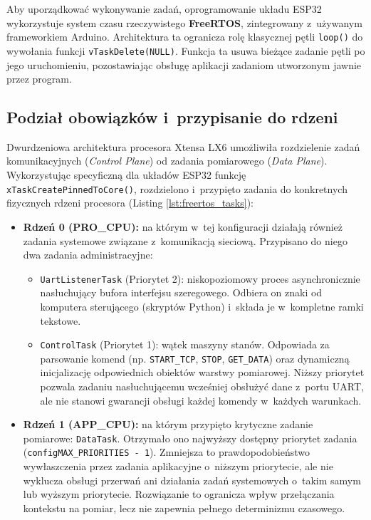 Aby uporządkować wykonywanie zadań, oprogramowanie układu ESP32 wykorzystuje system czasu rzeczywistego \textbf{FreeRTOS}, zintegrowany z~używanym frameworkiem Arduino.
Architektura ta ogranicza rolę klasycznej pętli \texttt{loop()} do wywołania funkcji \texttt{vTaskDelete(NULL)}. Funkcja ta usuwa bieżące zadanie pętli po jego uruchomieniu, pozostawiając obsługę aplikacji zadaniom utworzonym jawnie przez program.

\subsection{Podział obowiązków i~przypisanie do rdzeni}
Dwurdzeniowa architektura procesora Xtensa LX6 umożliwiła rozdzielenie zadań komunikacyjnych (\textit{Control Plane}) od zadania pomiarowego (\textit{Data Plane}).
Wykorzystując specyficzną dla układów ESP32 funkcję \texttt{xTaskCreatePinnedToCore()}, rozdzielono i~przypięto zadania do konkretnych fizycznych rdzeni procesora (Listing \ref{lst:freertos_tasks}):

\begin{itemize}
        \item \textbf{Rdzeń 0 (PRO\_CPU):}
            na którym w~tej konfiguracji działają również zadania systemowe związane z~komunikacją sieciową.
          Przypisano do niego dwa zadania administracyjne:
          \begin{itemize}
              \item \texttt{UartListenerTask} (Priorytet 2): niskopoziomowy proces asynchronicznie nasłuchujący bufora interfejsu szeregowego.
                    Odbiera on znaki od komputera sterującego (skryptów Python) i~składa je w~kompletne ramki tekstowe.
              \item \texttt{ControlTask} (Priorytet 1): wątek maszyny stanów.
                    Odpowiada za parsowanie komend (np. \texttt{START\_TCP}, \texttt{STOP}, \texttt{GET\_DATA}) oraz dynamiczną inicjalizację odpowiednich obiektów warstwy pomiarowej.
                    Niższy priorytet pozwala zadaniu nasłuchującemu wcześniej obsłużyć dane z~portu UART, ale nie stanowi gwarancji obsługi każdej komendy w~każdych warunkach.
          \end{itemize}
        \item \textbf{Rdzeń 1 (APP\_CPU):}
            na którym przypięto krytyczne zadanie pomiarowe: \texttt{DataTask}.
            Otrzymało ono najwyższy dostępny priorytet zadania (\texttt{configMAX\_PRIORITIES - 1}).
            Zmniejsza to prawdopodobieństwo wywłaszczenia przez zadania aplikacyjne o~niższym priorytecie, ale nie wyklucza obsługi przerwań ani działania zadań systemowych o~takim samym lub wyższym priorytecie.
            Rozwiązanie to ogranicza wpływ przełączania kontekstu na pomiar, lecz nie zapewnia pełnego determinizmu czasowego.
\end{itemize}

